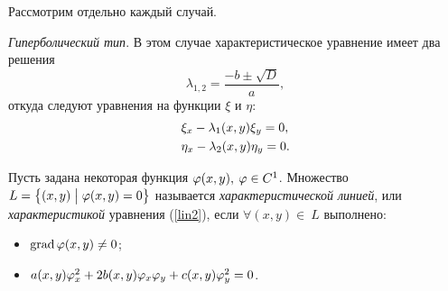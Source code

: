     Рассмотрим отдельно каждый случай.

    \textit{Гиперболический тип}. В этом случае характеристическое уравнение имеет два решения
    \begin{equation*}
        \lambda_{1,2} = \frac{-b \pm \sqrt{D}}{a},
    \end{equation*}
    откуда следуют уравнения на функции $\xi$ и $\eta$:
    \begin{align}
        & \xi_x - \lambda_1(x, y) \xi_y = 0,\notag \\ \label{char_eq_lin2}
        & \eta_x - \lambda_2(x, y) \eta_y = 0.
    \end{align}
    \begin{Def}
        Пусть задана некоторая функция $\varphi(x, y),\: \varphi \in C^1$. Множество $L = \left\{{(x, y) \bigm| \varphi(x, y) = 0}\right\}$ называется 
        \textit{характеристической линией}, или \textit{характеристикой} уравнения (\ref{lin2}), если $\forall (x, y)\in~L$ выполнено:
        \begin{itemize}
            \item $\operatorname{grad} \varphi(x, y) \not= 0$;
            \item $a(x,y)\varphi_x^2 + 2b(x,y)\varphi_x\varphi_y + c(x,y)\varphi_y^2 = 0$.
        \end{itemize}
    \end{Def}

